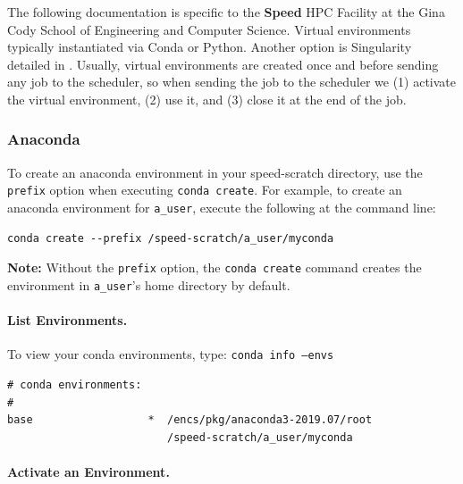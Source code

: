 \documentclass{easychair}
\begin{document}
The following documentation is specific to the \textbf{Speed} HPC Facility at the
Gina Cody School of Engineering and Computer Science.
%
Virtual environments typically instantiated via Conda or Python.
Another option is Singularity detailed in .
%
Usually, virtual environments are created once and before sending any job to the
scheduler, so when sending the job to the scheduler we (1) activate the virtual environment,
(2) use it, and (3) close it at the end of the job.


\subsubsection{Anaconda}
\label{sect:conda-venv}

To create an anaconda environment in your speed-scratch directory, use the \texttt{\-\-prefix} 
option when executing \texttt{conda create}. For example, to create an anaconda environment for 
\texttt{a\_user}, execute the following at the command line:

\begin{verbatim}
conda create --prefix /speed-scratch/a_user/myconda
\end{verbatim}

\vspace{10pt}
\noindent
\textbf{Note:} Without the \texttt{\-\-prefix} option, the \texttt{conda create} command creates the 
environment in \texttt{a\_user}'s home directory by default.
\vspace{10pt}

\paragraph{List Environments.}

To view your conda environments, type: \texttt{conda info --envs}

\begin{verbatim}
# conda environments:
#
base                  *  /encs/pkg/anaconda3-2019.07/root
                         /speed-scratch/a_user/myconda
\end{verbatim}      

\paragraph{Activate an Environment.}
\end{document}
